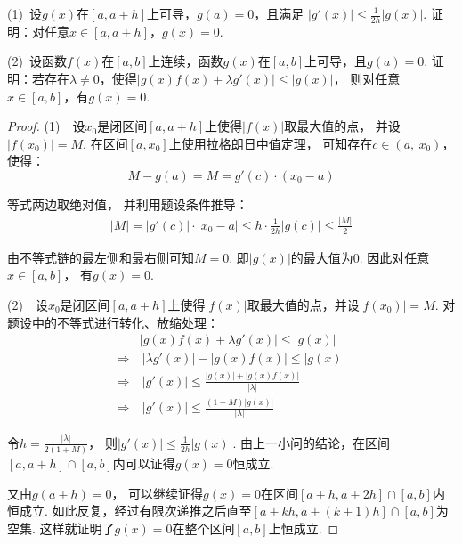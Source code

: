 \begin{example}
\label{ex:ch04-49}
(1)~设$g(x)$在$[a,a+h]$上可导，$g(a) = 0$，且满足
$|g'(x)| \le \frac{1}{2h}|g(x)|$.
证明：对任意$x \in [a,a+h]$，$g(x) = 0$.\par
(2)~设函数$f(x)$在$[a,b]$上连续，函数$g(x)$在$[a,b]$上可导，且$g(a)=0$.
证明：若存在$\lambda \ne 0$，使得$|g(x)f(x)+\lambda g'(x)| \le |g(x)|$，
则对任意$x \in [a,b]$，有$g(x) = 0$.
\end{example}

\begin{proof}
(1)~~设$x_0$是闭区间$[a,a+h]$上使得$|f(x)|$取最大值的点，
并设$|f(x_0)| = M$.
在区间$[a,x_0]$上使用拉格朗日中值定理，
可知存在$c \in (a,~x_0)$，使得：
$$
M - g(a) = M = g'(c) \cdot (x_0 - a)
$$

等式两边取绝对值，
并利用题设条件推导：
\begin{equation}
    \begin{aligned}
        |M| = |g'(c)|\cdot |x_0 - a|
        \le h \cdot \frac{1}{2h} |g(c)|
        \le \frac{|M|}{2}
        \nonumber
    \end{aligned}
\end{equation}

由不等式链的最左侧和最右侧可知$M=0$.
即$|g(x)|$的最大值为$0$.
因此对任意$x \in [a,b]$，
有$g(x) =0$.

(2)~~设$x_0$是闭区间$[a,a+h]$上使得$|f(x)|$取最大值的点，并设$|f(x_0)| = M$.
对题设中的不等式进行转化、放缩处理：
\begin{equation}
    \begin{aligned}
        &|g(x)f(x)+\lambda g'(x)| \le |g(x)| \\
        \Rightarrow &~ |\lambda g'(x)|-|g(x)f(x)| \le |g(x)| \\
        \Rightarrow &~ |g'(x)| \le \frac{|g(x)| + |g(x)f(x)|}{|\lambda|} \\
        \Rightarrow &~ |g'(x)| \le \frac{(1+M)|g(x)|}{|\lambda|}
        \nonumber
    \end{aligned}
\end{equation}\par
令$h = \frac{|\lambda|}{2(1+M)}$，
则$|g'(x)| \le \frac{1}{2h}|g(x)|$.
由上一小问的结论，在区间$[a,a+h]\cap[a,b]$内可以证得$g(x)=0$恒成立.

又由$g(a+h)=0$，
可以继续证得$g(x)=0$在区间$[a+h,a+2h]\cap[a,b]$内恒成立.
如此反复，经过有限次递推之后直至$[a+kh,a+(k+1)h]\cap[a,b]$为空集.
这样就证明了$g(x) = 0$在整个区间$[a,b]$上恒成立.
\end{proof}

